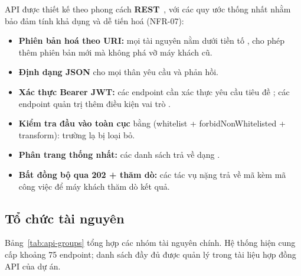 API được thiết kế theo phong cách \textbf{REST}~\cite{fielding2000rest},
với các quy ước thống nhất nhằm bảo đảm tính khả dụng và dễ tiến hoá
(NFR-07):

\begin{itemize}
  \item \textbf{Phiên bản hoá theo URI:} mọi tài nguyên nằm dưới tiền tố
        , cho phép thêm phiên bản mới mà không phá vỡ máy khách cũ.
  \item \textbf{Định dạng JSON} cho mọi thân yêu cầu và phản hồi.
  \item \textbf{Xác thực Bearer JWT:} các endpoint cần xác thực yêu cầu
        tiêu đề ; các endpoint quản
        trị thêm điều kiện vai trò .
  \item \textbf{Kiểm tra đầu vào toàn cục} bằng 
        (whitelist + forbidNonWhitelisted + transform): trường lạ bị loại bỏ.
  \item \textbf{Phân trang thống nhất:} các danh sách trả về dạng
        .
  \item \textbf{Bất đồng bộ qua 202 + thăm dò:} các tác vụ nặng trả về mã
         kèm mã công việc để máy khách thăm dò kết quả.
\end{itemize}

\subsection{Tổ chức tài nguyên}
\label{subsec:to-chuc-tai-nguyen}

Bảng~\ref{tab:api-groups} tổng hợp các nhóm tài nguyên chính. Hệ thống hiện
cung cấp khoảng 75 endpoint; danh sách đầy đủ được quản lý trong tài liệu
hợp đồng API của dự án.

